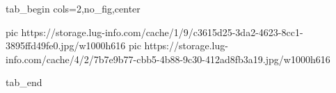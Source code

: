  
 
 
 
 


\ifcmt
  tab_begin cols=2,no_fig,center

     pic https://storage.lug-info.com/cache/1/9/c3615d25-3da2-4623-8cc1-3895ffd49fe0.jpg/w1000h616
		 pic https://storage.lug-info.com/cache/4/2/7b7e9b77-cbb5-4b88-9c30-412ad8fb3a19.jpg/w1000h616

  tab_end
\fi
